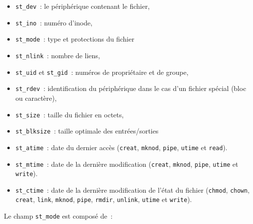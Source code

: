 \documentclass [twoside] {report}
\begin{document}
\begin {itemize}
    \item \texttt {st\_dev}~: le périphérique contenant le fichier,
    \item \texttt {st\_ino}~: numéro d'inode,
    \item \texttt {st\_mode}~: type et protections du fichier
    \item \texttt {st\_nlink}~: nombre de liens,
    \item \texttt {st\_uid} et \texttt {st\_gid}~: numéros de propriétaire et de groupe,
    \item \texttt {st\_rdev}~: identification du périphérique dans le cas
	d'un fichier spécial (bloc ou caractère),
    \item \texttt {st\_size}~: taille du fichier en octets,
    \item \texttt {st\_blksize}~: taille optimale des entrées/sorties
    \item \texttt {st\_atime}~: date du dernier accès (\texttt {creat},
	\texttt {mknod}, \texttt {pipe}, \texttt {utime} et \texttt {read}).
    \item \texttt {st\_mtime}~: date de la dernière modification
	(\texttt {creat}, \texttt {mknod}, \texttt {pipe}, \texttt {utime} et \texttt {write}).
    \item \texttt {st\_ctime}~: date de la dernière modification
	de l'état du fichier (\texttt {chmod}, \texttt {chown}, \texttt {creat},
	\texttt {link}, \texttt {mknod}, \texttt {pipe}, \texttt {rmdir}, \texttt {unlink},
	\texttt {utime} et \texttt {write}).
\end {itemize}

Le champ \texttt {st\_mode} est composé de~:
\end{document}

